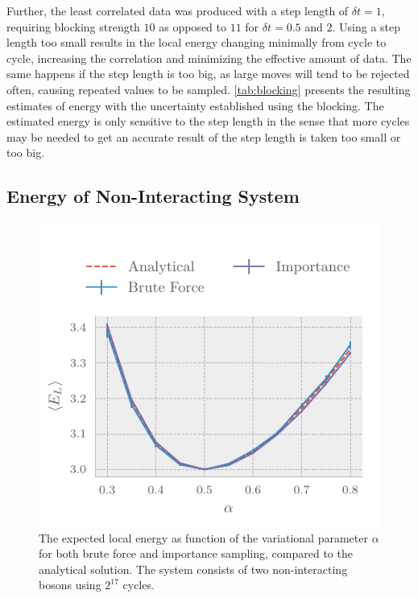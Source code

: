 Further, the least correlated data was produced with a step length of $\delta t = 1$,
requiring blocking strength $10$ as opposed to $11$ for $\delta t = 0.5$ and
$2$. Using a step length too small results in the local energy changing
minimally from cycle to cycle, increasing the correlation and minimizing the
effective amount of data. The same happens if the step length is too big, as
large moves will tend to be rejected often, causing repeated values to be
sampled. \autoref{tab:blocking} presents the resulting estimates of energy with
the uncertainty established using the blocking. The estimated
energy is only sensitive to the step length in the sense that more cycles may be
needed to get an accurate result of the step length is taken too small or too
big.

 
\subsection{Energy of Non-Interacting System}
\begin{figure}[ht]
  \centering
  \includegraphics[]{figures/energy_importance1.pdf}
  \caption{\label{fig:energybyalpha} The expected local energy as function of
    the variational parameter \(\alpha\) for both brute force and importance
    sampling, compared to the analytical solution. The system consists of two
    non-interacting bosons using \(2^{17}\) cycles.}
\end{figure}
